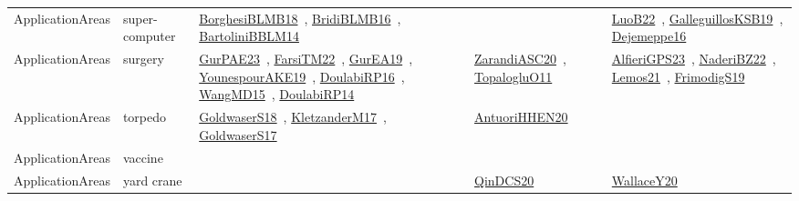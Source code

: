 {\begin{longtable}{lp{3cm}>{\raggedright\arraybackslash}p{6cm}>{\raggedright\arraybackslash}p{6cm}>{\raggedright\arraybackslash}p{8cm}}
ApplicationAreas & super-computer & \href{works/BorghesiBLMB18.pdf}{BorghesiBLMB18}~\cite{BorghesiBLMB18}, \href{works/BridiBLMB16.pdf}{BridiBLMB16}~\cite{BridiBLMB16}, \href{works/BartoliniBBLM14.pdf}{BartoliniBBLM14}~\cite{BartoliniBBLM14} &  & \href{works/LuoB22.pdf}{LuoB22}~\cite{LuoB22}, \href{works/GalleguillosKSB19.pdf}{GalleguillosKSB19}~\cite{GalleguillosKSB19}, \href{works/Dejemeppe16.pdf}{Dejemeppe16}~\cite{Dejemeppe16}\\
ApplicationAreas & surgery & \href{works/GurPAE23.pdf}{GurPAE23}~\cite{GurPAE23}, \href{works/FarsiTM22.pdf}{FarsiTM22}~\cite{FarsiTM22}, \href{works/GurEA19.pdf}{GurEA19}~\cite{GurEA19}, \href{works/YounespourAKE19.pdf}{YounespourAKE19}~\cite{YounespourAKE19}, \href{works/DoulabiRP16.pdf}{DoulabiRP16}~\cite{DoulabiRP16}, \href{works/WangMD15.pdf}{WangMD15}~\cite{WangMD15}, \href{works/DoulabiRP14.pdf}{DoulabiRP14}~\cite{DoulabiRP14} & \href{works/ZarandiASC20.pdf}{ZarandiASC20}~\cite{ZarandiASC20}, \href{works/TopalogluO11.pdf}{TopalogluO11}~\cite{TopalogluO11} & \href{works/AlfieriGPS23.pdf}{AlfieriGPS23}~\cite{AlfieriGPS23}, \href{works/NaderiBZ22.pdf}{NaderiBZ22}~\cite{NaderiBZ22}, \href{works/Lemos21.pdf}{Lemos21}~\cite{Lemos21}, \href{works/FrimodigS19.pdf}{FrimodigS19}~\cite{FrimodigS19}\\
ApplicationAreas & torpedo & \href{works/GoldwaserS18.pdf}{GoldwaserS18}~\cite{GoldwaserS18}, \href{works/KletzanderM17.pdf}{KletzanderM17}~\cite{KletzanderM17}, \href{works/GoldwaserS17.pdf}{GoldwaserS17}~\cite{GoldwaserS17} & \href{works/AntuoriHHEN20.pdf}{AntuoriHHEN20}~\cite{AntuoriHHEN20} & \\
ApplicationAreas & vaccine &  &  & \\
ApplicationAreas & yard crane &  & \href{works/QinDCS20.pdf}{QinDCS20}~\cite{QinDCS20} & \href{works/WallaceY20.pdf}{WallaceY20}~\cite{WallaceY20}\\
\end{longtable}
}

